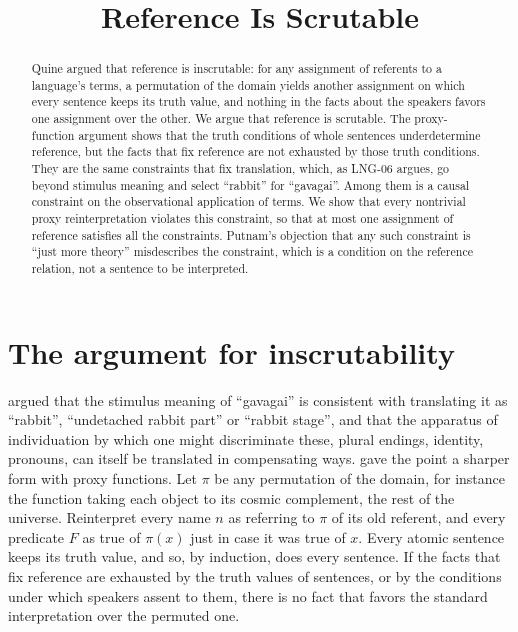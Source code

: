 \documentclass{situationist-preprint}
\title{Reference Is Scrutable}
\begin{document}
\maketitle

\begin{abstract}
Quine argued that reference is inscrutable: for any assignment of referents to a language's terms, a permutation of the domain yields another assignment on which every sentence keeps its truth value, and nothing in the facts about the speakers favors one assignment over the other. We argue that reference is scrutable. The proxy-function argument shows that the truth conditions of whole sentences underdetermine reference, but the facts that fix reference are not exhausted by those truth conditions. They are the same constraints that fix translation, which, as LNG-06 argues, go beyond stimulus meaning and select \enquote{rabbit} for \enquote{gavagai}. Among them is a causal constraint on the observational application of terms. We show that every nontrivial proxy reinterpretation violates this constraint, so that at most one assignment of reference satisfies all the constraints. Putnam's objection that any such constraint is \enquote{just more theory} misdescribes the constraint, which is a condition on the reference relation, not a sentence to be interpreted.
\end{abstract}

\section{The argument for inscrutability}

\citet{Quine1960} argued that the stimulus meaning of \enquote{gavagai} is consistent with translating it as \enquote{rabbit}, \enquote{undetached rabbit part} or \enquote{rabbit stage}, and that the apparatus of individuation by which one might discriminate these, plural endings, identity, pronouns, can itself be translated in compensating ways. \citet{Quine1968} gave the point a sharper form with proxy functions. Let $\pi$ be any permutation of the domain, for instance the function taking each object to its cosmic complement, the rest of the universe. Reinterpret every name $n$ as referring to $\pi$ of its old referent, and every predicate $F$ as true of $\pi(x)$ just in case it was true of $x$. Every atomic sentence keeps its truth value, and so, by induction, does every sentence. If the facts that fix reference are exhausted by the truth values of sentences, or by the conditions under which speakers assent to them, there is no fact that favors the standard interpretation over the permuted one.
\end{document}
